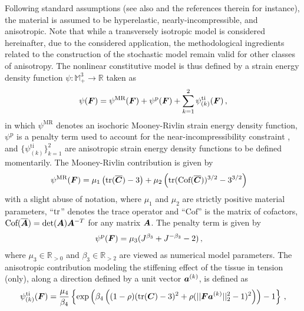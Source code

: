 Following standard assumptions \cite{Holzapfel2000,Gasser2006,Holzapfel2010,Holzapfel2015,Holzapfel2017} (see also \cite{Brinkhues2013ModelingAS} and the references therein for instance), the material is assumed to be hyperelastic, nearly-incompressible, and anisotropic. Note that while a transversely isotropic model is considered hereinafter, due to the considered application, the methodological ingredients related to the construction of the stochastic model remain valid for other classes of anisotropy. The nonlinear constitutive model is thus defined by a strain energy density function $\psi:\mathbb{M}^3_+ \to \mathbb{R}$ taken as
\begin{align}
    \psi(\boldsymbol{F}) = \psi^{\text{MR}}(\boldsymbol{F}) + \psi^\text{p}(\boldsymbol{F}) + \sum_{k=1}^{2} \psi_{(k)}^\text{ti}(\boldsymbol{F})\,, \label{eq: strain energy density function}
\end{align}
in which $\psi^{\text{MR}}$ denotes an isochoric Mooney-Rivlin strain energy density function, $\psi^\text{p}$ is a penalty term used to account for the near-incompressibility constraint \cite{charrier1988existence}, and $\{\psi_{(k)}^\text{ti}\}_{k = 1}^2$ are anisotropic strain energy density functions to be defined momentarily. The Mooney-Rivlin contribution is given by
\begin{align}
    \psi^{\text{MR}}(\boldsymbol{F}) &= \mu_1 \left( \textnormal{tr}(\overline{\boldsymbol{C}}) - 3 \right) + \mu_2 \left( \textnormal{tr}(\text{Cof}(\overline{\boldsymbol{C}}))^{3/2} - 3^{3/2}\right) \label{eq: MR} 
\end{align}
with a slight abuse of notation, where $\mu_1$ and $\mu_2$ are strictly positive material parameters, ``$\textnormal{tr}$'' denotes the trace operator and ``$\text{Cof}$'' is the matrix of cofactors, $\text{Cof}(\overline{\boldsymbol{A}}) = \det(\boldsymbol{A})\boldsymbol{A}^{-T}$ for any matrix $\boldsymbol{A}$. The penalty term is given by
\begin{align}
    \psi^\text{p}(\boldsymbol{F}) & = \mu_3 (J^{\beta_3}+J^{-\beta_3} - 2)\,, \label{eq: penalty}
\end{align}
where $\mu_3 \in \mathbb{R}_{> 0}$ and $\beta_3 \in \mathbb{R}_{> 2}$ are viewed as numerical model parameters. The anisotropic contribution modeling the stiffening effect of the tissue in tension (only), along a direction defined by a unit vector $\boldsymbol{a}^{(k)}$, is defined as
\begin{equation}
    \psi_{(k)}^\text{ti}(\boldsymbol{F}) = \frac{\mu_4}{\beta_4} \left\{ \exp \left(\beta_4 \left( (1-\rho)(\textnormal{tr}(\boldsymbol{C})-3)^2 + \rho (\vert \vert \boldsymbol{F} \boldsymbol{a}^{(k)} \vert \vert ^2_2 - 1)^2 \right) \right) - 1\right\}\,, \label{eq: psi tissue}
\end{equation}

